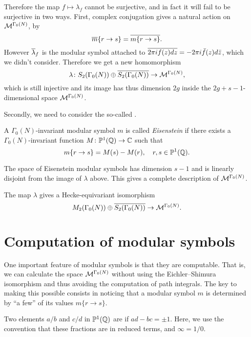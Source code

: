 Therefore the map $f\mapsto \lambda_f$ cannot be surjective, and in fact it will fail to be surjective in two ways. First, complex conjugation gives a natural action on $\mathcal{M}^{\Gamma_0(N)}$, by
\[
\overline{m}\{r\to s\} = \overline{m\{r\to s\}}.
\]
However $\overline{\lambda}_f$ is the modular symbol attached to $\overline{2\pi i f(z)dz} = -2\pi i \bar f(z) d\bar z$, which we didn't consider. Therefore we get a new homomorphism
\[
\lambda\colon S_2(\Gamma_0(N))\oplus\overline{S_2(\Gamma_0(N))} \to \mathcal{M}^{\Gamma_0(N)},
\]
which is still injective and its image has thus dimension $2g$ inside the $2g+s-1$-dimensional space $\mathcal{M}^{\Gamma_0(N)}$.

Secondly, we need to consider the so-called .
\begin{definition}
  A $\Gamma_0(N)$-invariant modular symbol $m$ is called \emph{Eisenstein} if there exists a $\Gamma_0(N)$-invariant function $M\colon \mathbb{P}^1(\mathbb{Q})\to \mathbb{C}$ such that
\[
m\{r\to s\} = M(s)-M(r),\quad r,s\in \mathbb{P}^1(\mathbb{Q}).
\]
\end{definition}
The space of Eisenstein modular symbols has dimension $s-1$ and is linearly disjoint from the image of $\lambda$ above. This gives a complete description of $\mathcal{M}^{\Gamma_0(N)}$.
\begin{theorem}
  The map $\lambda$ gives a Hecke-equivariant isomorphism
\[
M_2(\Gamma_0(N))\oplus \overline{S_2(\Gamma_0(N))} \to \mathcal{M}^{\Gamma_0(N)}.
\]
\end{theorem}

\section{Computation of modular symbols}

One important feature of modular symbols is that they are computable. That is, we can calculate the space $\mathcal{M}^{\Gamma_0(N)}$ without using the Eichler--Shimura isomorphism and thus avoiding the computation of path integrals. The key to making this possible consists in noticing that a modular symbol $m$ is determined by ``a few'' of its values $m\{r\to s\}$.

\begin{definition}
  Two elements $a/b$ and $c/d$ in $\mathbb{P}^1(\mathbb{Q})$ are  if $ad-bc=\pm 1$. Here, we use the convention that these fractions are in reduced terms, and $\infty = 1/0$.
\end{definition}


